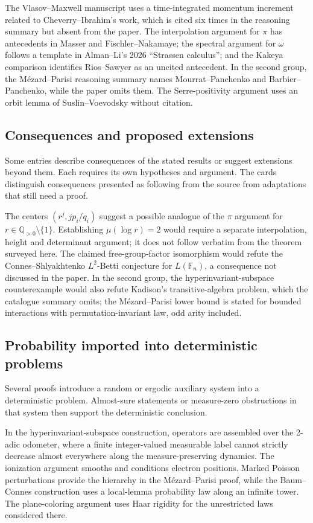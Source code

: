 \documentclass[11pt]{article}
\newcommand{\F}{\mathbb{F}}
\begin{document}
The Vlasov--Maxwell manuscript uses a time-integrated momentum increment related to Cheverry--Ibrahim's work, which is cited six times in the reasoning summary but absent from the paper. The interpolation argument for $\pi$ has antecedents in Masser and Fischler--Nakamaye; the spectral argument for $\omega$ follows a template in Alman--Li's 2026 ``Strassen calculus''; and the Kakeya comparison identifies Rios--Sawyer as an uncited antecedent. In the second group, the M\'ezard--Parisi reasoning summary names Mourrat--Panchenko and Barbier--Panchenko, while the paper omits them. The Serre-positivity argument uses an orbit lemma of Suslin--Voevodsky without citation.

\subsection{Consequences and proposed extensions}

Some entries describe consequences of the stated results or suggest extensions beyond them. Each requires its own hypotheses and argument. The cards distinguish consequences presented as following from the source from adaptations that still need a proof.

The centers $(r^j,jp_i/q_i)$ suggest a possible analogue of the $\pi$ argument for $r\in\mathbb Q_{>0}\setminus\{1\}$. Establishing $\mu(\log r)=2$ would require a separate interpolation, height and determinant argument; it does not follow verbatim from the theorem surveyed here. The claimed free-group-factor isomorphism would refute the Connes--Shlyakhtenko $L^2$-Betti conjecture for $L(\F_n)$, a consequence not discussed in the paper. In the second group, the hyperinvariant-subspace counterexample would also refute Kadison's transitive-algebra problem, which the catalogue summary omits; the Mézard--Parisi lower bound is stated for bounded interactions with permutation-invariant law, odd arity included.

\subsection{\texorpdfstring{Probability imported into deterministic problems}{Probability imported into deterministic problems}}

Several proofs introduce a random or ergodic auxiliary system into a deterministic problem. Almost-sure statements or measure-zero obstructions in that system then support the deterministic conclusion.

In the hyperinvariant-subspace construction, operators are assembled over the 2-adic odometer, where a finite integer-valued measurable label cannot strictly decrease almost everywhere along the measure-preserving dynamics. The ionization argument smooths and conditions electron positions. Marked Poisson perturbations provide the hierarchy in the Mézard--Parisi proof, while the Baum--Connes construction uses a local-lemma probability law along an infinite tower. The plane-coloring argument uses Haar rigidity for the unrestricted laws considered there.
\end{document}
